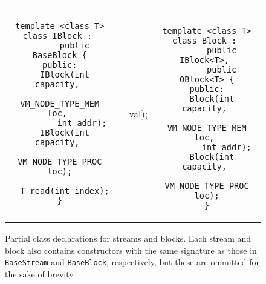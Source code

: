 \begin{figure}[t]
\begin{minipage}{6in}
\begin{tabular}{c|c|c|c}
\begin{minipage}{1.95in}
\begin{verbatim}
template <class T>
class IBlock : 
      public BaseBlock {
public:
  IBlock(int capacity, 
         VM_NODE_TYPE_MEM loc, 
         int addr);
  IBlock(int capacity, 
         VM_NODE_TYPE_PROC loc);

  T read(int index);
}
  \end{verbatim}
\end{minipage}
&
\begin{minipage}{2.0in}
  \scriptsize
  \begin{verbatim}

template <class T>
class OBlock :
      public BaseBlock {
public:
  OBlock(int capacity, 
         VM_NODE_TYPE_MEM loc, 
         int addr);
  OBlock(int capacity, 
         VM_NODE_TYPE_PROC loc);

  void write(int index, T& val);
}
  \end{verbatim}
\end{minipage}
&
\begin{minipage}{1.8in}
  \scriptsize
  \begin{verbatim}

template <class T>
class Block : 
      public IBlock<T>, 
      public OBlock<T> {
public:
  Block(int capacity, 
        VM_NODE_TYPE_MEM loc, 
        int addr);
  Block(int capacity, 
        VM_NODE_TYPE_PROC loc);
}
  \end{verbatim}
\end{minipage}
\end{tabular}
\end{minipage}
\caption{Partial class declarations for streams and blocks.  Each stream and block also contains constructors with the same signature as those in {\tt BaseStream} and {\tt BaseBlock}, respectively, but these are ommitted for the sake of brevity.\protect\label{fig:declgrid}}
\vspace{-6pt}
\end{figure}
